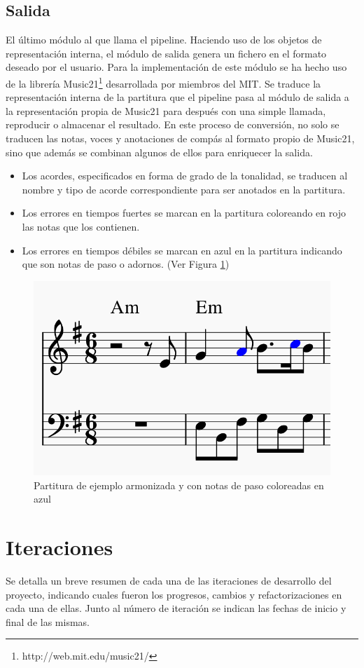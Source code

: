 \subsection{Salida}
El último módulo al que llama el pipeline. Haciendo uso de los objetos de representación interna, el módulo de salida genera un fichero en el formato deseado por el usuario. 
Para la implementación de este módulo se ha hecho uso de la librería Music21\footnote{http://web.mit.edu/music21/} desarrollada por miembros del MIT. Se traduce la representación interna de la partitura que el pipeline pasa al módulo de salida a la representación propia de Music21 para después con una simple llamada, reproducir o almacenar el resultado.
En este proceso de conversión, no solo se traducen las notas, voces y anotaciones de compás al formato propio de Music21, sino que además se combinan algunos de ellos para enriquecer la salida.
\begin{itemize}
	\item Los acordes, especificados en forma de grado de la tonalidad, se traducen al nombre y tipo de acorde correspondiente para ser anotados en la partitura.
	\item Los errores en tiempos fuertes se marcan en la partitura coloreando en rojo las notas que los contienen.
	\item Los errores en tiempos débiles se marcan en azul en la partitura indicando que son notas de paso o adornos. (Ver Figura \ref{fig:simple-piece-final})
\end{itemize}

\begin{figure}[h]
	\centering
	\includegraphics[width=0.4\linewidth]{imagenes/example_final_score.png}
	\caption{Partitura de ejemplo armonizada y con notas de paso coloreadas en azul}
	\label{fig:simple-piece-final}
\end{figure}


\section{Iteraciones}
Se detalla un breve resumen de cada una de las iteraciones de desarrollo del proyecto, indicando cuales fueron los progresos, cambios y refactorizaciones en cada una de ellas. Junto al número de iteración se indican las fechas de inicio y final de las mismas.

